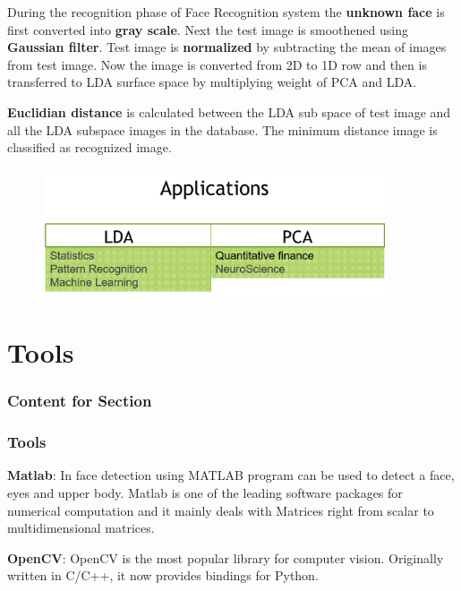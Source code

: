 \documentclass[xcolor=dvipsnames]{beamer}
\begin{document}
     \begin{frame}
    During the recognition phase of Face Recognition system the \textbf{unknown face} is first converted into \textbf{gray scale}. Next the test image is smoothened using \textbf{Gaussian filter}. Test image is \textbf{normalized} by subtracting the mean of images from test image. Now the image is converted from 2D to 1D row and then is transferred to LDA surface space by multiplying weight of PCA and LDA. \newline 

\textbf{Euclidian distance} is calculated between the LDA sub space of test image and all the LDA subspace images in the database. The minimum distance image is classified as recognized image.
       \end{frame}
       
    \begin{frame}
    \begin{figure}[H]
        \graphicspath{{figs/}}
        \includegraphics[width=0.9\textwidth]{img6.png}
    \end{figure}
    \end{frame}
    
    \section{Tools}
    \begin{frame}
      \frametitle{Content for Section \thesection}
      \tableofcontents[currentsection]
    \end{frame}
    
    \begin{frame}
        \frametitle{Tools}
    \textbf{Matlab}: In face detection using MATLAB program can be used to detect a face, eyes and upper body. Matlab is one of the leading software packages for numerical computation and it mainly deals with Matrices right from scalar to multidimensional matrices. \newline

\textbf{OpenCV}: OpenCV is the most popular library for computer vision. Originally written in C/C++, it now provides bindings for Python.
    \end{frame}
    
\end{document}
